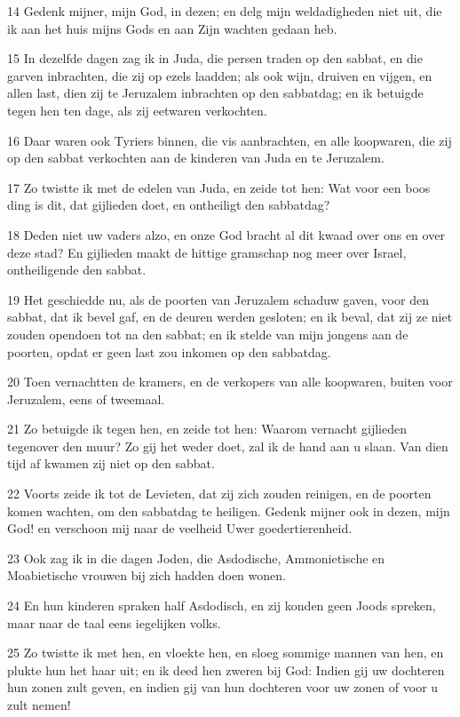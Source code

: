 \par 14 Gedenk mijner, mijn God, in dezen; en delg mijn weldadigheden niet uit, die ik aan het huis mijns Gods en aan Zijn wachten gedaan heb.
\par 15 In dezelfde dagen zag ik in Juda, die persen traden op den sabbat, en die garven inbrachten, die zij op ezels laadden; als ook wijn, druiven en vijgen, en allen last, dien zij te Jeruzalem inbrachten op den sabbatdag; en ik betuigde tegen hen ten dage, als zij eetwaren verkochten.
\par 16 Daar waren ook Tyriers binnen, die vis aanbrachten, en alle koopwaren, die zij op den sabbat verkochten aan de kinderen van Juda en te Jeruzalem.
\par 17 Zo twistte ik met de edelen van Juda, en zeide tot hen: Wat voor een boos ding is dit, dat gijlieden doet, en ontheiligt den sabbatdag?
\par 18 Deden niet uw vaders alzo, en onze God bracht al dit kwaad over ons en over deze stad? En gijlieden maakt de hittige gramschap nog meer over Israel, ontheiligende den sabbat.
\par 19 Het geschiedde nu, als de poorten van Jeruzalem schaduw gaven, voor den sabbat, dat ik bevel gaf, en de deuren werden gesloten; en ik beval, dat zij ze niet zouden opendoen tot na den sabbat; en ik stelde van mijn jongens aan de poorten, opdat er geen last zou inkomen op den sabbatdag.
\par 20 Toen vernachtten de kramers, en de verkopers van alle koopwaren, buiten voor Jeruzalem, eens of tweemaal.
\par 21 Zo betuigde ik tegen hen, en zeide tot hen: Waarom vernacht gijlieden tegenover den muur? Zo gij het weder doet, zal ik de hand aan u slaan. Van dien tijd af kwamen zij niet op den sabbat.
\par 22 Voorts zeide ik tot de Levieten, dat zij zich zouden reinigen, en de poorten komen wachten, om den sabbatdag te heiligen. Gedenk mijner ook in dezen, mijn God! en verschoon mij naar de veelheid Uwer goedertierenheid.
\par 23 Ook zag ik in die dagen Joden, die Asdodische, Ammonietische en Moabietische vrouwen bij zich hadden doen wonen.
\par 24 En hun kinderen spraken half Asdodisch, en zij konden geen Joods spreken, maar naar de taal eens iegelijken volks.
\par 25 Zo twistte ik met hen, en vloekte hen, en sloeg sommige mannen van hen, en plukte hun het haar uit; en ik deed hen zweren bij God: Indien gij uw dochteren hun zonen zult geven, en indien gij van hun dochteren voor uw zonen of voor u zult nemen!
